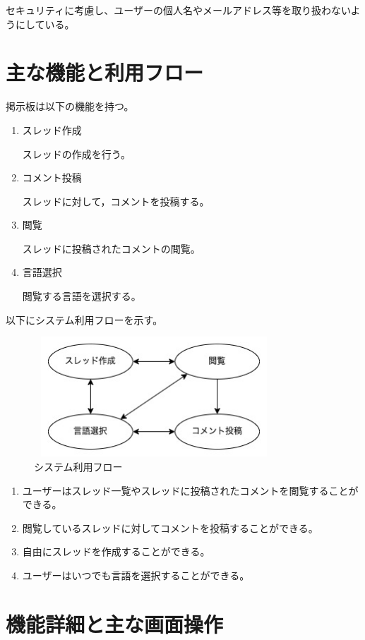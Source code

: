 \documentclass[b5paper,12pt]{jsreport}
\begin{document}
セキュリティに考慮し、ユーザーの個人名やメールアドレス等を取り扱わないようにしている。

\section{主な機能と利用フロー}

掲示板は以下の機能を持つ。
\begin{enumerate}
	\item スレッド作成
	
	スレッドの作成を行う。
	\item コメント投稿
	
	スレッドに対して，コメントを投稿する。
	\item 閲覧
	
	スレッドに投稿されたコメントの閲覧。
	\item 言語選択
	
	閲覧する言語を選択する。
\end{enumerate}

以下にシステム利用フローを示す。

\begin{figure}[htbp]
	\centering
	\includegraphics[width=90mm,height=45mm]{img/system.jpg}

	\caption{システム利用フロー}
\end{figure}

\begin{enumerate}
	\item ユーザーはスレッド一覧やスレッドに投稿されたコメントを閲覧することができる。
	\item 閲覧しているスレッドに対してコメントを投稿することができる。
	\item 自由にスレッドを作成することができる。
	\item ユーザーはいつでも言語を選択することができる。
\end{enumerate}


\section{機能詳細と主な画面操作}
\end{document}
